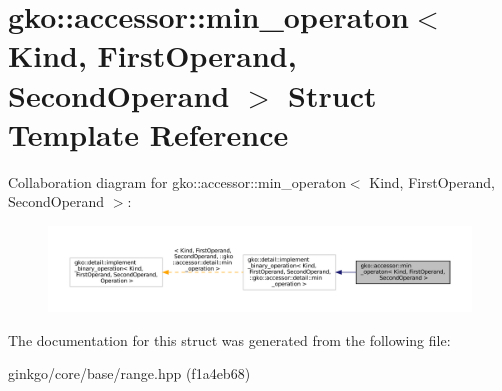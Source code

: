 \hypertarget{structgko_1_1accessor_1_1min__operaton}{}\section{gko\+:\+:accessor\+:\+:min\+\_\+operaton$<$ Kind, First\+Operand, Second\+Operand $>$ Struct Template Reference}
\label{structgko_1_1accessor_1_1min__operaton}


Collaboration diagram for gko\+:\+:accessor\+:\+:min\+\_\+operaton$<$ Kind, First\+Operand, Second\+Operand $>$\+:
\nopagebreak
\begin{figure}[H]
\begin{center}
\leavevmode
\includegraphics[width=350pt]{structgko_1_1accessor_1_1min__operaton__coll__graph}
\end{center}
\end{figure}


The documentation for this struct was generated from the following file\+:\begin{DoxyCompactItemize}
\item 
ginkgo/core/base/range.\+hpp (f1a4eb68)\end{DoxyCompactItemize}
